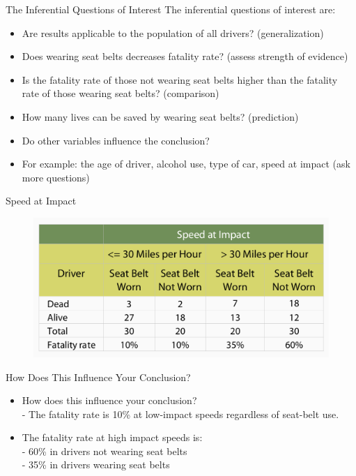 \begin{frame}[t]{The Inferential Questions of Interest}
	The inferential questions of interest are: \\
	\begin{itemize}
		\item Are results applicable to the population of all drivers? (generalization)
		\item Does wearing seat belts decreases fatality rate? (assess strength of evidence)
		\item Is the fatality rate of those not wearing seat belts higher than the fatality rate of those wearing seat belts? (comparison)
		\item How many lives can be saved by wearing seat belts? (prediction)
		\item Do other variables influence the conclusion?
		\item For example: the age of driver, alcohol use, type of car, speed at impact (ask more questions)
	\end{itemize}
	
\end{frame}
\begin{frame}[t]{Speed at Impact}
	\begin{figure}
		\includegraphics[width=12cm]{img/seat_belt2}
	\end{figure}
	
\end{frame}

\begin{frame}[t]{How Does This Influence Your Conclusion?}
	\begin{itemize}
		\item How does this influence your conclusion? \\
		- The fatality rate is 10\% at low-impact speeds regardless of seat-belt use.
		\item The fatality rate at high impact speeds is: \\
		-  60\% in drivers not wearing seat belts \\
		-  35\% in drivers wearing seat belts
	\end{itemize}
	
\end{frame}

